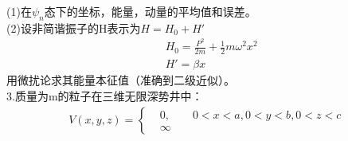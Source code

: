 \documentclass[UTF8]{article}
\numberwithin{equation}{section}
\begin{document}
(1)在$\psi_n$态下的坐标，能量，动量的平均值和误差。\\
(2)设非简谐振子的H表示为$H=H_0+H'$
\begin{align*}
    &H_0=\frac{P^2}{2m}+\frac{1}{2}m\omega^2 x^2\\
    &H'=\beta x
\end{align*}
用微扰论求其能量本征值（准确到二级近似）。\\[10pt]
3.质量为m的粒子在三维无限深势井中：
\begin{align*}
    V(x,y,z)=\begin{cases}
        &0,\qquad 0<x<a,0<y<b,0<z<c\\
        &\infty
    \end{cases}
\end{align*}
\end{document}
